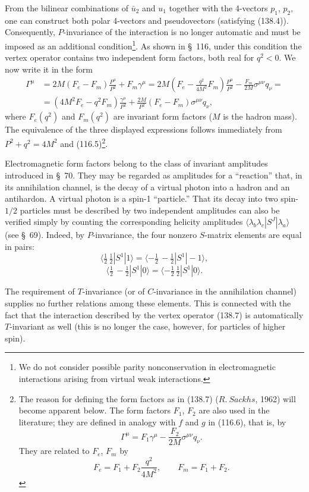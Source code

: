 From the bilinear combinations of $\bar u_2$ and $u_1$ together with the 4-vectors $p_1$, $p_2$, one can construct both polar 4-vectors and pseudovectors (satisfying (138.4)). Consequently, $P$-invariance of the interaction is no longer automatic and must be imposed as an additional condition\footnote{We do not consider possible parity nonconservation in electromagnetic interactions arising from virtual weak interactions.}. As shown in \S~116, under this condition the vertex operator contains two independent form factors, both real for $q^2<0$. We now write it in the form
\begin{equation}
\begin{aligned}
\Gamma^\mu
&=2M(F_e-F_m)\frac{P^\mu}{P^2}+F_m\gamma^\mu
=2M\left(F_e-\frac{q^2}{4M^2}F_m\right)\frac{P^\mu}{P^2}
-\frac{F_m}{2M}\sigma^{\mu\nu}q_\nu={}\\
&=(4M^2F_e-q^2F_m)\frac{\gamma^\mu}{P^2}
+\frac{2M}{P^2}(F_e-F_m)\sigma^{\mu\nu}q_\nu,
\end{aligned}
\tag{138.7}
\end{equation}
where $F_e(q^2)$ and $F_m(q^2)$ are invariant form factors ($M$ is the hadron mass). The equivalence of the three displayed expressions follows immediately from $P^2+q^2=4M^2$ and (116.5)\footnote{The reason for defining the form factors as in (138.7) ($R.~Sackhs$, 1962) will become apparent below. The form factors $F_1$, $F_2$ are also used in the literature; they are defined in analogy with $f$ and $g$ in (116.6), that is, by
\[
\Gamma^\mu=F_1\gamma^\mu-\frac{F_2}{2M}\sigma^{\mu\nu}q_\nu.
\]
They are related to $F_e$, $F_m$ by
\[
F_e=F_1+F_2\frac{q^2}{4M^2},\qquad F_m=F_1+F_2.
\] }.

Electromagnetic form factors belong to the class of invariant amplitudes introduced in \S~70. They may be regarded as amplitudes for a ``reaction'' that, in its annihilation channel, is the decay of a virtual photon into a hadron and an antihardon. A virtual photon is a spin-1 ``particle.'' That its decay into two spin-$1/2$ particles must be described by two independent amplitudes can also be verified simply by counting the corresponding helicity amplitudes $\langle\lambda_b\lambda_c|S^J|\lambda_a\rangle$ (see \S~69). Indeed, by $P$-invariance, the four nonzero $S$-matrix elements are equal in pairs:
\[
\langle\tfrac12\,\tfrac12|S^1|1\rangle
=\langle-\tfrac12\,-\tfrac12|S^1|-1\rangle,
\]
\[
\langle\tfrac12\,-\tfrac12|S^1|0\rangle
=\langle-\tfrac12\,\tfrac12|S^1|0\rangle.
\]

The requirement of $T$-invariance (or of $C$-invariance in the annihilation channel) supplies no further relations among these
elements. This is connected with the fact that the interaction described by the vertex operator (138.7) is automatically $T$-invariant as well (this is no longer the case, however, for particles of higher spin).

